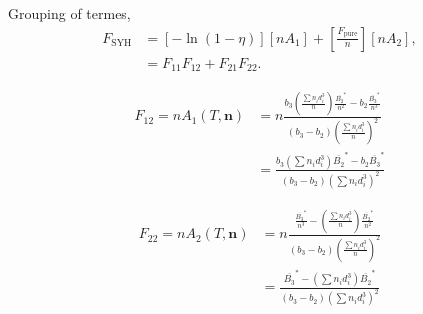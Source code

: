 \documentclass[english]{../thermomemo/thermomemo}
\newcommand*{\lb}{\left(}
\newcommand*{\rb}{\right)}
\newcommand{\mbn}{\ensuremath{\mathbf{n}}\xspace}
\newcommand{\pure}{\ensuremath{\text{pure}}\xspace}
\newcommand{\SYH}{\ensuremath{\text{SYH}}\xspace}
\begin{document}
Grouping of termes,
\begin{align}
  \label{eq:F_syh}
  F_\SYH &=  \left[-\ln\lb 1-\eta\rb \right] \left[n A_1\right] +  \left[\frac{F_\pure}{n} \right] \left[n A_2 \right], \nonumber \\
  &= F_{11}F_{12} + F_{21}F_{22}.
\end{align}

\begin{align}
  \label{eq:F12}
  F_{12} = n A_1\lb T, \mbn \rb  &=  n \frac{b_3 \lb \frac{\sum n_i d_i^3}{n} \rb  \frac{\overline{B_2}^*}{n^2} - b_2 \frac{\overline{B_3}^*}{n^3}}{\lb b_3-b_2\rb \lb \frac{\sum n_i d_i^3}{n} \rb^2} \nonumber\\
  &=  \frac{b_3 \lb \sum n_i d_i^3 \rb  \overline{B_2}^* - b_2 \overline{B_3}^*}{\lb b_3-b_2\rb \lb \sum n_i d_i^3 \rb^2}
\end{align}

\begin{align}
  \label{eq:a2_n}
  F_{22} = n A_2\lb T, \mbn \rb  &=  n \frac{ \frac{\overline{B_3}^*}{n^3} -  \lb \frac{\sum n_i d_i^3}{n} \rb  \frac{\overline{B_2}^*}{n^2}}{\lb b_3-b_2\rb \lb \frac{\sum n_i d_i^3}{n} \rb^2} \nonumber\\
  &=  \frac{\overline{B_3}^* -  \lb \sum n_i d_i^3 \rb  \overline{B_2}^*}{\lb b_3-b_2\rb \lb \sum n_i d_i^3 \rb^2}
\end{align}
\end{document}
